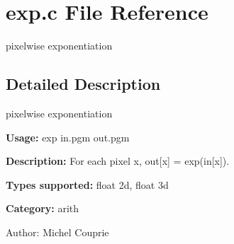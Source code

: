 \section{exp.c File Reference}
\label{exp_8c}
pixelwise exponentiation 



\subsection{Detailed Description}
pixelwise exponentiation 

{\bf Usage:} exp in.pgm out.pgm

{\bf Description:} For each pixel x, out[x] = exp(in[x]).

{\bf Types supported:} float 2d, float 3d

{\bf Category:} arith

\begin{Desc}
\item[Author:]Michel Couprie \end{Desc}
